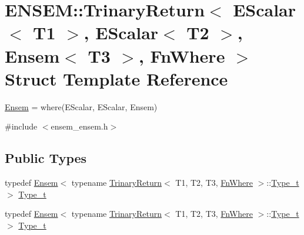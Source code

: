 \hypertarget{structENSEM_1_1TrinaryReturn_3_01EScalar_3_01T1_01_4_00_01EScalar_3_01T2_01_4_00_01Ensem_3_01T3_01_4_00_01FnWhere_01_4}{}\section{E\+N\+S\+EM\+:\+:Trinary\+Return$<$ E\+Scalar$<$ T1 $>$, E\+Scalar$<$ T2 $>$, Ensem$<$ T3 $>$, Fn\+Where $>$ Struct Template Reference}
\label{structENSEM_1_1TrinaryReturn_3_01EScalar_3_01T1_01_4_00_01EScalar_3_01T2_01_4_00_01Ensem_3_01T3_01_4_00_01FnWhere_01_4}


\mbox{\hyperlink{classENSEM_1_1Ensem}{Ensem}} = where(\+E\+Scalar, E\+Scalar, Ensem)  




{\ttfamily \#include $<$ensem\+\_\+ensem.\+h$>$}

\subsection*{Public Types}
\begin{DoxyCompactItemize}
\item 
typedef \mbox{\hyperlink{classENSEM_1_1Ensem}{Ensem}}$<$ typename \mbox{\hyperlink{structENSEM_1_1TrinaryReturn}{Trinary\+Return}}$<$ T1, T2, T3, \mbox{\hyperlink{structENSEM_1_1FnWhere}{Fn\+Where}} $>$\+::\mbox{\hyperlink{structENSEM_1_1TrinaryReturn_3_01EScalar_3_01T1_01_4_00_01EScalar_3_01T2_01_4_00_01Ensem_3_01T3_01_4_00_01FnWhere_01_4_ad84eb99fb099d2facf6b12f6d8cc510d}{Type\+\_\+t}} $>$ \mbox{\hyperlink{structENSEM_1_1TrinaryReturn_3_01EScalar_3_01T1_01_4_00_01EScalar_3_01T2_01_4_00_01Ensem_3_01T3_01_4_00_01FnWhere_01_4_ad84eb99fb099d2facf6b12f6d8cc510d}{Type\+\_\+t}}
\item 
typedef \mbox{\hyperlink{classENSEM_1_1Ensem}{Ensem}}$<$ typename \mbox{\hyperlink{structENSEM_1_1TrinaryReturn}{Trinary\+Return}}$<$ T1, T2, T3, \mbox{\hyperlink{structENSEM_1_1FnWhere}{Fn\+Where}} $>$\+::\mbox{\hyperlink{structENSEM_1_1TrinaryReturn_3_01EScalar_3_01T1_01_4_00_01EScalar_3_01T2_01_4_00_01Ensem_3_01T3_01_4_00_01FnWhere_01_4_ad84eb99fb099d2facf6b12f6d8cc510d}{Type\+\_\+t}} $>$ \mbox{\hyperlink{structENSEM_1_1TrinaryReturn_3_01EScalar_3_01T1_01_4_00_01EScalar_3_01T2_01_4_00_01Ensem_3_01T3_01_4_00_01FnWhere_01_4_ad84eb99fb099d2facf6b12f6d8cc510d}{Type\+\_\+t}}
\end{DoxyCompactItemize}


